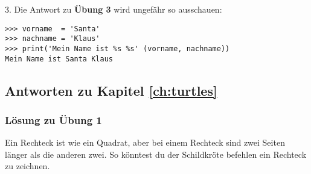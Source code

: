 \noindent
3. Die Antwort zu \textbf{Übung 3} wird ungefähr so ausschauen:

\begin{listing}
\begin{verbatim}
>>> vorname  = 'Santa'
>>> nachname = 'Klaus'
>>> print('Mein Name ist %s %s' (vorname, nachname))
Mein Name ist Santa Klaus
\end{verbatim}
\end{listing}

\subsection*{Antworten zu Kapitel \ref{ch:turtles}}

\noindent
\subsubsection{Lösung zu Übung 1}
Ein Rechteck ist wie ein Quadrat, aber bei einem Rechteck sind zwei Seiten länger als die anderen zwei. So könntest du der Schildkröte befehlen ein Rechteck zu zeichnen.

